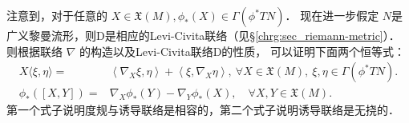 注意到，对于任意的 $X \in \mathfrak{X}(M), \phi_*(X) \in \Gamma(\phi^* T N)$．
现在进一步假定 $N$是广义黎曼流形，则$\mathrm{D}$是相应的Levi-Civita联络（见\S\ref{chrg:sec_riemann-metric}）．
则根据联络 $\nabla$ 的构造以及Levi-Civita联络$\mathrm{D}$的性质，
可以证明下面两个恒等式：
\begin{align}
    X\langle\xi, \eta\rangle= &\left\langle\nabla_X \xi, \eta\right\rangle+\left\langle\xi,
     \nabla_X \eta\right\rangle, \ \forall X \in \mathfrak{X}(M),\ \xi, \eta \in \Gamma(\phi^* T N) .
     \label{chfb:eqn_induce-con-compatibility} \\
    \phi_*([X, Y])=&\nabla_X \phi_*(Y)-\nabla_Y \phi_*(X), \quad \forall X, Y \in \mathfrak{X}(M) .
    \label{chfb:eqn_induce-con-NoTorsion}
\end{align}
第一个式子说明度规与诱导联络是相容的，第二个式子说明诱导联络是无挠的．



